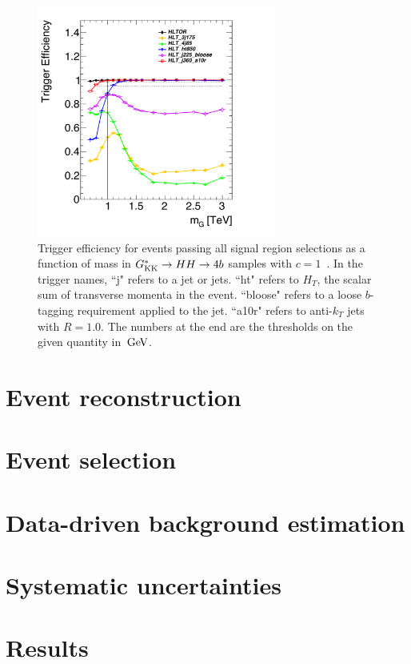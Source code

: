 \begin{figure}[h!]
  \centering
  \captionsetup{justification=centering}

  \includegraphics[width=0.7\textwidth]{figures/PassSignal_HLTeff}
  \caption{Trigger efficiency for events passing all signal region selections as a function of mass in $G^*_{\rm KK} \to HH \to 4b$ samples with $c = 1$~\cite{Tony}. In the trigger names, ``j" refers to a jet or jets. ``ht" refers to $H_{T}$, the scalar sum of transverse momenta in the event. ``bloose" refers to a loose $b$-tagging requirement applied to the jet. ``a10r" refers to anti-$k_{T}$ jets with $R = 1.0$. The numbers at the end are the thresholds on the given quantity in $\GeV$.}
  \label{fig:trig_eff_4b}
\end{figure}



\section{Event reconstruction}

\section{Event selection}

\section{Data-driven background estimation}

\section{Systematic uncertainties}

\section{Results}


